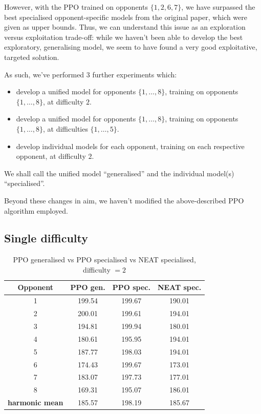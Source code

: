 \documentclass[conference]{IEEEtran}
\begin{document}
    However, with the PPO trained on opponents $\{1, 2, 6, 7\}$, we have surpassed the best specialised opponent-specific models from the original paper, which were given as upper bounds\cite{evoman}. Thus, we can understand this issue as an exploration versus exploitation trade-off: while we haven't been able to develop the best exploratory, generalising model, we seem to have found a very good exploitative, targeted solution.

    As such, we've performed $3$ further experiments which:
    \begin{itemize}
    \item develop a unified model for opponents $\{1, \dots, 8\}$, training on opponents $\{1, \dots, 8\}$, at difficulty $2$.
    \item develop a unified model for opponents $\{1, \dots, 8\}$, training on opponents $\{1, \dots, 8\}$, at difficulties $\{1, \dots, 5\}$.
    \item develop individual models for each opponent, training on each respective opponent, at difficulty $2$.
    \end{itemize}

    We shall call the unified model ``generalised'' and the individual model(s) ``specialised''.

    Beyond these changes in aim, we haven't modified the above-described PPO algorithm employed.

    \subsection{Single difficulty}
    
    \begin{table}[htbp]
        \caption{PPO generalised vs PPO specialised vs NEAT specialised, difficulty $= 2$}
        \begin{center}
            \begin{tabular}{|c|c|c|c|}
                \hline
                \textbf{Opponent}&\textbf{PPO gen.}&\textbf{PPO spec.}&\textbf{NEAT spec.} \\
                \hline
                 1 &  199.54 &  199.67 &  190.01 \\
                 2 &  200.01 &  199.61 &  194.01 \\
                 3 &  194.81 &  199.94 &  180.01 \\
                 4 &  180.61 &  195.95 &  194.01 \\
                 5 &  187.77 &  198.03 &  194.01 \\
                 6 &  174.43 &  199.67 &  173.01 \\
                 7 &  183.07 &  197.73 &  177.01 \\
                 8 &  169.31 &  195.07 &  186.01 \\
                \hline
                \textbf{harmonic mean} & 185.57 & 198.19 & 185.67 \\
                \hline
            \end{tabular}
            \label{PPO generalized vs specialized vs NEAT}
        \end{center}
    \end{table}    
\end{document}

